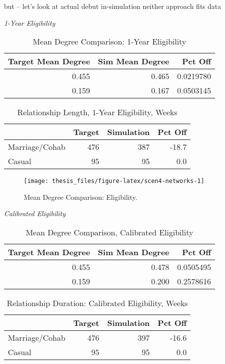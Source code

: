 \documentclass [11pt, proquest] {uwthesis}[2015/03/03]
\begin{document}
but -- let's look at actual debut in-simulation neither approach fits
data

\emph{1-Year Eligibility}
\begin{table}

\caption{\label{tab:scen4-tab}Mean Degree Comparison: 1-Year Eligibility}
\centering
\begin{tabular}[t]{rrr}
\toprule
Target Mean Degree & Sim Mean Degree & Pct Off\\
\midrule
0.455 & 0.465 & 0.0219780\\
0.159 & 0.167 & 0.0503145\\
\bottomrule
\end{tabular}
\end{table}
\begin{table}

\caption{\label{tab:scen4-duration}Relationship Length, 1-Year Eligibility, Weeks}
\centering
\begin{tabular}[t]{lrrr}
\toprule
  & Target & Simulation & Pct Off\\
\midrule
Marriage/Cohab & 476 & 387 & -18.7\\
Casual & 95 & 95 & 0.0\\
\bottomrule
\end{tabular}
\end{table}
\begin{figure}

{\centering \texttt{[image: thesis\_files/figure-latex/scen4-networks-1]} 

}

\caption{Mean Degree Comparison: Eligibility.}\label{fig:scen4-networks}
\end{figure}
\emph{Calibrated Eligibility}
\begin{table}

\caption{\label{tab:calib-elig-tab}Mean Degree Comparison, Calibrated Eligibility}
\centering
\begin{tabular}[t]{rrr}
\toprule
Target Mean Degree & Sim Mean Degree & Pct Off\\
\midrule
0.455 & 0.478 & 0.0505495\\
0.159 & 0.200 & 0.2578616\\
\bottomrule
\end{tabular}
\end{table}
\begin{table}

\caption{\label{tab:calib-elig-duration}Relationship Duration: Calibrated Eligibility, Weeks}
\centering
\begin{tabular}[t]{lrrr}
\toprule
  & Target & Simulation & Pct Off\\
\midrule
Marriage/Cohab & 476 & 397 & -16.6\\
Casual & 95 & 95 & 0.0\\
\bottomrule
\end{tabular}
\end{table}
\end{document}
